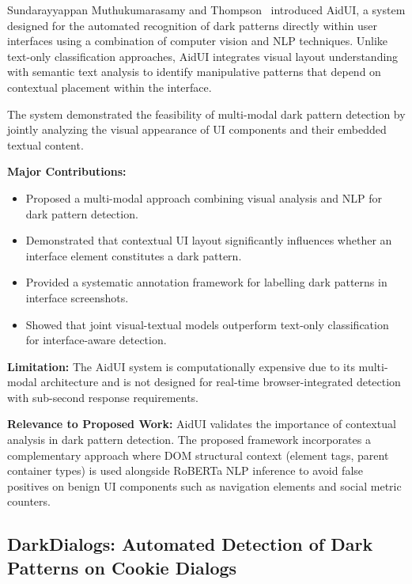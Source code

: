 Sundarayyappan Muthukumarasamy and Thompson~\cite{aidui2023} introduced AidUI, a system designed for the automated recognition of dark patterns directly within user interfaces using a combination of computer vision and NLP techniques. Unlike text-only classification approaches, AidUI integrates visual layout understanding with semantic text analysis to identify manipulative patterns that depend on contextual placement within the interface.

The system demonstrated the feasibility of multi-modal dark pattern detection by jointly analyzing the visual appearance of UI components and their embedded textual content.

\vspace{0.3cm}

\textbf{Major Contributions:}
\begin{itemize}
\item Proposed a multi-modal approach combining visual analysis and NLP for dark pattern detection.
\item Demonstrated that contextual UI layout significantly influences whether an interface element constitutes a dark pattern.
\item Provided a systematic annotation framework for labelling dark patterns in interface screenshots.
\item Showed that joint visual-textual models outperform text-only classification for interface-aware detection.
\end{itemize}

\vspace{0.3cm}

\textbf{Limitation:}
The AidUI system is computationally expensive due to its multi-modal architecture and is not designed for real-time browser-integrated detection with sub-second response requirements.

\vspace{0.3cm}

\textbf{Relevance to Proposed Work:}
AidUI validates the importance of contextual analysis in dark pattern detection. The proposed framework incorporates a complementary approach where DOM structural context (element tags, parent container types) is used alongside RoBERTa NLP inference to avoid false positives on benign UI components such as navigation elements and social metric counters.


\subsection{DarkDialogs: Automated Detection of Dark Patterns on Cookie Dialogs}

